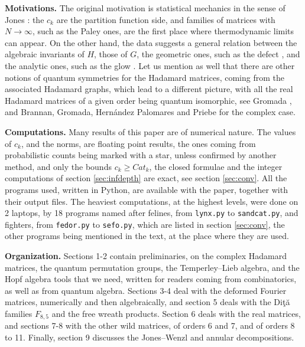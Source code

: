 \documentclass[11pt]{amsart}
\begin{document}
\medskip

\noindent\textbf{Motivations.} The original motivation is statistical mechanics in the sense of Jones \cite{jon,jo2}: the $c_k$ are the partition function side, and families of matrices with $N\to\infty$, such as the Paley ones, are the first place where thermodynamic limits can appear. On the other hand, the data suggests a general relation between the algebraic invariants of $H$, those of $G$, the geometric ones, such as the defect \cite{ba1,tz2}, and the analytic ones, such as the glow \cite{banicaHM}. Let us mention as well that there are other notions of quantum symmetries for the Hadamard matrices, coming from the associated Hadamard graphs, which lead to a different picture, with all the real Hadamard matrices of a given order being quantum isomorphic, see Gromada \cite{gro}, and Brannan, Gromada, Hern\'andez Palomares and Priebe \cite{bghp} for the complex case.

\medskip

\noindent\textbf{Computations.} Many results of this paper are of numerical nature. The values of $c_k$, and the norms, are floating point results, the ones coming from probabilistic counts being marked with a star, unless confirmed by another method, and only the bounds $c_k\geq Cat_k$, the closed formulae and the integer computations of section \ref{sec:infdepth} are exact, see section \ref{sec:conv}. All the programs used, written in Python, are available with the paper, together with their output files. The heaviest computations, at the highest levels, were done on 2 laptops, by 18 programs named after felines, from \texttt{lynx.py} to \texttt{sandcat.py}, and fighters, from \texttt{fedor.py} to \texttt{sefo.py}, which are listed in section \ref{sec:conv}, the other programs being mentioned in the text, at the place where they are used.

\medskip

\noindent\textbf{Organization.} Sections 1-2 contain preliminaries, on the complex Hadamard matrices, the quantum permutation groups, the Temperley--Lieb algebra, and the Hopf algebra tools that we need, written for readers coming from combinatorics, as well as from quantum algebra. Sections 3-4 deal with the deformed Fourier matrices, numerically and then algebraically, and section 5 deals with the Di\c t\u a families $F_{8,5}$ and the free wreath products. Section 6 deals with the real matrices, and sections 7-8 with the other wild matrices, of orders 6 and 7, and of orders 8 to 11. Finally, section 9 discusses the Jones--Wenzl and annular decompositions.
\end{document}
